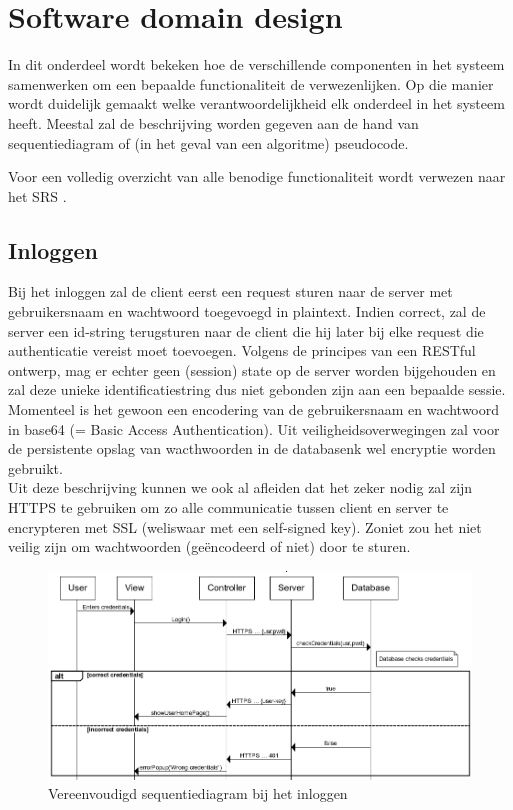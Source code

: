 \documentclass{article}
\begin{document}
\clearpage

\section{Software domain design}

In dit onderdeel wordt bekeken hoe de verschillende componenten in het systeem samenwerken om een bepaalde functionaliteit de verwezenlijken. Op die manier wordt duidelijk gemaakt welke verantwoordelijkheid elk onderdeel in het systeem heeft.
Meestal zal de beschrijving worden gegeven aan de hand van sequentiediagram of (in het geval van een algoritme) pseudocode.

Voor een volledig overzicht van alle benodige functionaliteit wordt verwezen naar het SRS \cite{Xtreport:SRS}.

\subsection{Inloggen}

Bij het inloggen zal de client eerst een request sturen naar de server met gebruikersnaam en wachtwoord toegevoegd in plaintext. Indien correct, zal de server een id-string terugsturen naar de client die hij later bij elke request die authenticatie vereist moet toevoegen. Volgens de principes van een RESTful ontwerp, mag er echter geen (session) state op de server worden bijgehouden en zal deze unieke identificatiestring dus niet gebonden zijn aan een bepaalde sessie. Momenteel is het gewoon een encodering van de gebruikersnaam en wachtwoord in base64 (= Basic Access Authentication).
Uit veiligheidsoverwegingen zal voor de persistente opslag van wacthwoorden in de databasenk wel encryptie worden gebruikt. \\ 

Uit deze beschrijving kunnen we ook al afleiden dat het zeker nodig zal zijn HTTPS te gebruiken om zo alle communicatie tussen client en server te encrypteren met SSL (weliswaar met een self-signed key). Zoniet zou het niet veilig zijn om wachtwoorden (ge\"encodeerd of niet) door te sturen.

\begin{figure}[!h]
\centering
 \includegraphics[width=145mm]{login-sequence.png}
 \caption{Vereenvoudigd sequentiediagram bij het inloggen}
 \label{login-sequence}
\end{figure}
\end{document}
